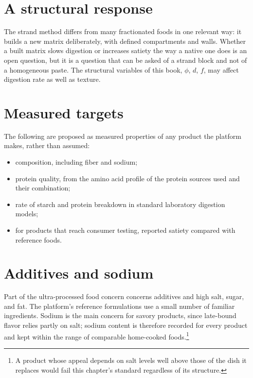 \documentclass[11pt,openany]{book}
\theoremstyle{definition}
\begin{document}
\section{A structural response}

The strand method differs from many fractionated foods in one relevant way: it builds a new matrix deliberately, with defined compartments and walls. Whether a built matrix slows digestion or increases satiety the way a native one does is an open question, but it is a question that can be asked of a strand block and not of a homogeneous paste. The structural variables of this book, $\phi$, $d$, $f$, may affect digestion rate as well as texture.

\section{Measured targets}

The following are proposed as measured properties of any product the platform makes, rather than assumed:

\begin{itemize}
\item composition, including fiber and sodium;
\item protein quality, from the amino acid profile of the protein sources used and their combination;
\item rate of starch and protein breakdown in standard laboratory digestion models;
\item for products that reach consumer testing, reported satiety compared with reference foods.
\end{itemize}

\section{Additives and sodium}

Part of the ultra-processed food concern concerns additives and high salt, sugar, and fat. The platform's reference formulations use a small number of familiar ingredients. Sodium is the main concern for savory products, since late-bound flavor relies partly on salt; sodium content is therefore recorded for every product and kept within the range of comparable home-cooked foods.\footnote{A product whose appeal depends on salt levels well above those of the dish it replaces would fail this chapter's standard regardless of its structure.}

\end{document}
